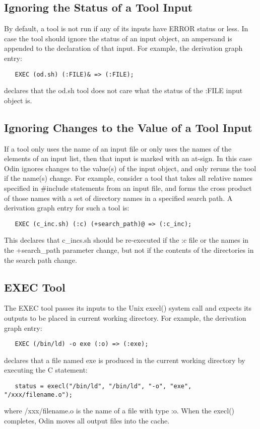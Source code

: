 \subsection{Ignoring the Status of a Tool Input}

By default, a tool is not run if any of its inputs 
have {\ex ERROR} status or less.
In case the tool should ignore the status of an input object,
an ampersand is appended to the declaration of that input.
For example, the derivation graph entry:
\begin{verbatim}
   EXEC (od.sh) (:FILE)& => (:FILE);
\end{verbatim}
declares that the {\ex od.sh} tool does not care
what the status of the {\ex :FILE} input object is.

\subsection{Ignoring Changes to the Value of a Tool Input}

If a tool only uses the name of an input file
or only uses the names of the elements of an input list,
then that input is marked with an at-sign.
In this case Odin ignores changes to the value(s) of the input object,
and only reruns the tool if the name(s) change.
For example, consider a tool that takes all relative names specified
in {\ex \#include} statements from an input file,
and forms the cross product of those names with a set of directory names
in a specified search path.
A derivation graph entry for such a tool is:
\begin{verbatim}
   EXEC (c_inc.sh) (:c) (+search_path)@ => (:c_inc);
\end{verbatim}
This declares that {\ex c\_incs.sh} should be re-executed
if the {\ex :c} file or the names in the {\ex +search\_path} parameter change,
but not if the contents of the directories in the search path change.

\subsection{EXEC Tool}
\label{exec}

The {\ex EXEC} tool passes its inputs to the Unix {\ex execl()} system call
and expects its outputs to be placed in current working directory.
For example, the derivation graph entry:
\begin{verbatim}
   EXEC (/bin/ld) -o exe (:o) => (:exe);
\end{verbatim}
declares that a file named {\ex exe}
is produced in the current working directory by executing the C statement:
\begin{verbatim}
   status = execl("/bin/ld", "/bin/ld", "-o", "exe", "/xxx/filename.o");
\end{verbatim}
where {\ex /xxx/filename.o} is the name of a file with type {\ex :o}.
When the {\ex execl()} completes,
Odin moves all output files into the cache.

